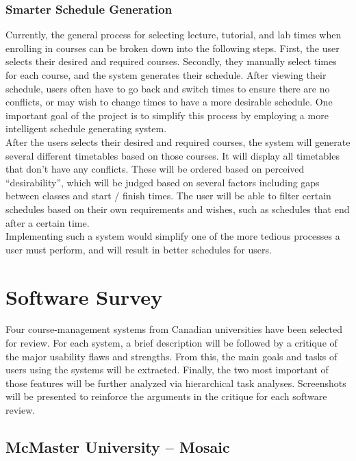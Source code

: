\documentclass[10pt]{article}
\begin{document}
\begin{multicols}{2}
\subsubsection*{Smarter Schedule Generation}
Currently, the general process for selecting lecture, tutorial, and lab times 
when enrolling in courses can be broken down into the following steps. First, 
the user selects their desired and required courses. Secondly, they manually 
select times for each course, and the system generates their schedule. After 
viewing their schedule, users often have to go back and switch times to ensure 
there are no conflicts, or may wish to change times to have a more desirable 
schedule. One important goal of the project is to simplify this process by 
employing a more intelligent schedule generating system.\\

After the users selects their desired and required courses, the system will 
generate several different timetables based on those courses. It will display 
all timetables that don't have any conflicts. These will be ordered based on 
perceived ``desirability'', which will be judged based on several factors 
including gaps between classes and start / finish times. The user will be able 
to filter certain schedules based on their own requirements and wishes, such as 
schedules that end after a certain time.\\

Implementing such a system would simplify one of the more tedious processes a 
user must perform, and will result in better schedules for users.

\section*{Software Survey}
Four course-management systems from Canadian universities have been selected for 
review. For each system, a brief description will be followed by a critique of 
the major usability flaws and strengths. From this, the main goals and tasks of 
users using the systems will be extracted. Finally, the two most important of 
those features will be further analyzed via hierarchical task analyses. 
Screenshots will be presented to reinforce the arguments in the critique for 
each software review.

\subsection*{McMaster University -- Mosaic}


\end{multicols}
\end{document}
